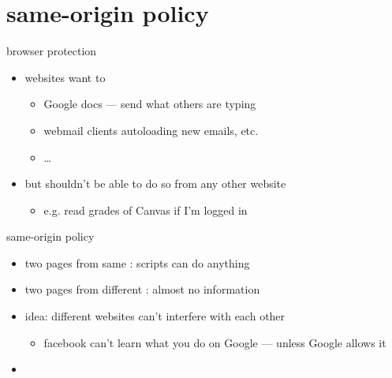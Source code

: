 \section{same-origin policy}

\begin{frame}{browser protection}
    \begin{itemize}
        \item websites want to 
    \begin{itemize}
        \item Google docs --- send what others are typing
        \item webmail clients autoloading new emails, etc.
        \item \ldots
    \end{itemize}
    \item but shouldn't be able to do so from any other website
        \begin{itemize}
        \item e.g. read grades of Canvas if I'm logged in
        \end{itemize}
    \end{itemize}
\end{frame}

\begin{frame}{same-origin policy}
    \begin{itemize}
        \item two pages from same : scripts can do anything
        \item two pages from different : almost no information
            \vspace{.5cm}
        \item idea: different websites can't interfere with each other
            \begin{itemize}
            \item facebook can't learn what you do on Google --- unless Google allows it
            \end{itemize}
        \item {}
    \end{itemize}
\end{frame}

